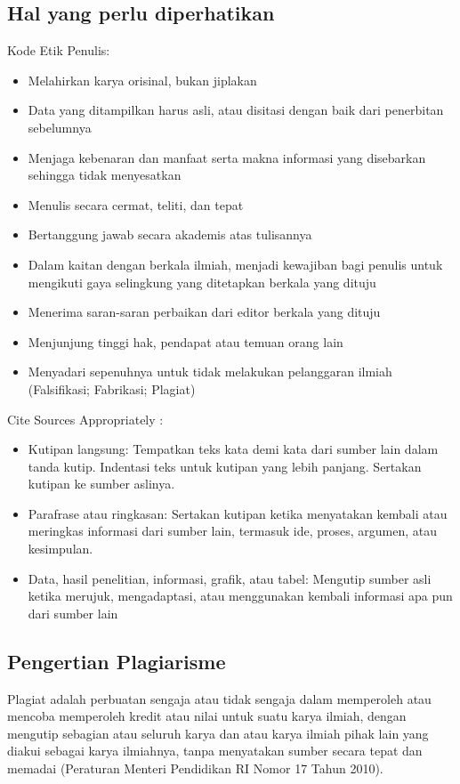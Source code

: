 \subsection{Hal yang perlu diperhatikan}
Kode Etik Penulis:
\begin{itemize}
    \item Melahirkan karya orisinal, bukan jiplakan
    \item Data yang ditampilkan harus asli, atau disitasi dengan baik dari penerbitan sebelumnya
    \item Menjaga kebenaran dan manfaat serta makna informasi yang disebarkan sehingga tidak menyesatkan
    \item Menulis secara cermat, teliti, dan tepat
    \item Bertanggung jawab secara akademis atas tulisannya
    \item Dalam kaitan dengan berkala ilmiah, menjadi kewajiban bagi penulis untuk mengikuti gaya selingkung yang ditetapkan berkala yang dituju
    \item Menerima saran-saran perbaikan dari editor berkala yang dituju
    \item Menjunjung tinggi hak, pendapat atau temuan orang lain
    \item Menyadari sepenuhnya untuk tidak melakukan pelanggaran ilmiah (Falsifikasi; Fabrikasi; Plagiat)
\end{itemize}
Cite Sources Appropriately :
\begin{itemize}
    \item Kutipan langsung: Tempatkan teks kata demi kata dari sumber lain dalam tanda kutip. Indentasi teks untuk kutipan yang lebih panjang. Sertakan kutipan ke sumber aslinya.
    \item Parafrase atau ringkasan: Sertakan kutipan ketika menyatakan kembali atau meringkas informasi dari sumber lain, termasuk ide, proses, argumen, atau kesimpulan.
    \item Data, hasil penelitian, informasi, grafik, atau tabel: Mengutip sumber asli ketika merujuk, mengadaptasi, atau menggunakan kembali informasi apa pun dari sumber lain
\end{itemize}

\subsection{Pengertian Plagiarisme}
Plagiat adalah perbuatan sengaja atau tidak sengaja dalam memperoleh atau mencoba memperoleh kredit atau nilai untuk suatu karya ilmiah, dengan mengutip sebagian atau seluruh karya dan atau karya ilmiah pihak lain yang diakui sebagai karya ilmiahnya, tanpa menyatakan sumber secara tepat dan memadai (Peraturan Menteri Pendidikan RI Nomor 17 Tahun 2010).

